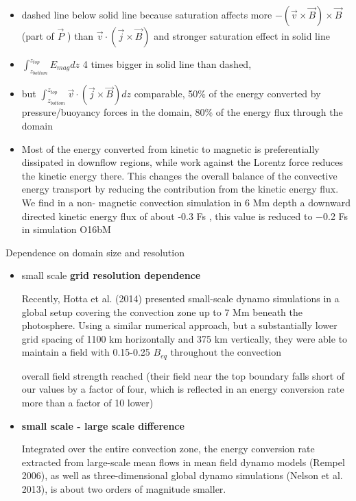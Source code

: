 \documentclass{beamer}
\begin{document}
\begin{frame}
\begin{itemize}
\item dashed line below solid line because saturation affects more  $-(\vec{v} \times \vec{B}) \times \vec{B}$ (part of $\vec{P}$ ) than $\vec{v} \cdot \left( \vec{j} \times \vec{B} \right)$
and stronger saturation effect in solid line
\item  $\int_{z_{bottom}}^{z_{top}}{E_{mag} dz}$ 4 times bigger in solid line than dashed, 
\item but $\int_{z_{bottom}}^{z_{top}}{ \vec{v} \cdot \left( \vec{j} \times \vec{B} \right)dz }$ comparable, 50\% of the energy
converted by pressure/buoyancy forces in the domain, 80\% of the
energy flux through the domain
\item Most of
the energy converted from kinetic to magnetic is preferentially
dissipated in downflow regions, while work against the Lorentz
force reduces the kinetic energy there. This changes the overall
balance of the convective energy transport by reducing the
contribution from the kinetic energy flux. We find in a non-
magnetic convection simulation in 6 Mm depth a downward
directed kinetic energy flux of about -0.3 Fs , this value is
reduced to −0.2 Fs in simulation O16bM
\end{itemize}
\end{frame}


\begin{frame}{Dependence on domain size and resolution}
\begin{itemize}
\item small scale {\bf grid resolution dependence}

Recently, Hotta et al. (2014) presented small-scale dynamo
simulations in a global setup covering the convection zone
up to 7 Mm beneath the photosphere. Using a similar numerical
 approach, but a substantially lower grid spacing of
1100 km horizontally and 375 km vertically, they were able to
maintain a field with 0.15-0.25 $B_{eq}$ throughout the convection

overall field strength reached (their
field near the top boundary falls short of our values by a factor
of four, which is reflected in an energy conversion rate more
than a factor of 10 lower)

\item {\bf small scale - large scale difference}

Integrated over the entire convection
zone, the energy conversion rate
extracted from large-scale mean
flows in mean field dynamo models (Rempel 2006), as well
as three-dimensional global dynamo simulations (Nelson et al.
2013), is about two orders of magnitude smaller.

\end{itemize}

\end{frame}
\end{document}
